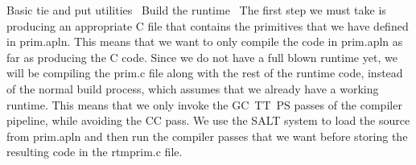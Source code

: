 \documentclass{article}%
\begin{document}
\LA{}Basic \code{}tie\edoc{} and \code{}put\edoc{} utilities~{\nwtagstyle{}}\RA{}
\LA{}Build the runtime~{\nwtagstyle{}}\RA{}
\eatline
{}\nwendcode{}\nwdocspar
The first step we must take is producing an appropriate C file that
contains the primitives that we have defined in {\Tt{}prim.apln\nwendquote}.
This means that we want to only compile the code in {\Tt{}prim.apln\nwendquote}
as far as producing the C code.
Since we do not have a full blown runtime yet,
we will be compiling the {\Tt{}prim.c\nwendquote} file along with the rest of the
runtime code,
instead of the normal build process,
which assumes that we already have a working runtime.
This means that we only invoke the {\Tt{}GC\ TT\ PS\nwendquote} passes of the
compiler pipeline, while avoiding the {\Tt{}CC\nwendquote} pass.
We use the SALT system to load the source from {\Tt{}prim.apln\nwendquote} and then
run the compiler passes that we want before storing the resulting
code in the {\Tt{}rtm{\nwbackslash}prim.c\nwendquote} file.
\end{document}
